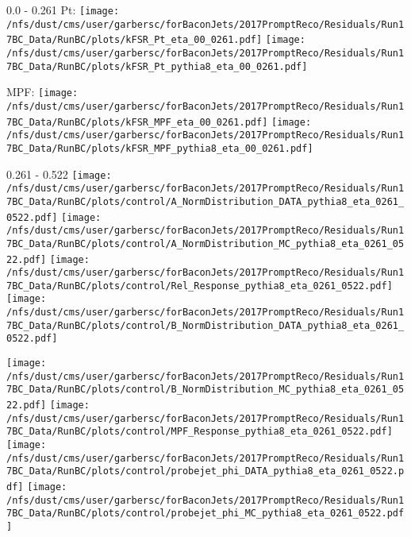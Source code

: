 \documentclass[t,compress]{beamer}
\begin{document}
\begin{frame}{0.0 - 0.261}
	 Pt: \texttt{[image: /nfs/dust/cms/user/garbersc/forBaconJets/2017PromptReco/Residuals/Run17BC\_Data/RunBC/plots/kFSR\_Pt\_eta\_00\_0261.pdf]}
	\texttt{[image: /nfs/dust/cms/user/garbersc/forBaconJets/2017PromptReco/Residuals/Run17BC\_Data/RunBC/plots/kFSR\_Pt\_pythia8\_eta\_00\_0261.pdf]}
\newline

	 MPF: \texttt{[image: /nfs/dust/cms/user/garbersc/forBaconJets/2017PromptReco/Residuals/Run17BC\_Data/RunBC/plots/kFSR\_MPF\_eta\_00\_0261.pdf]}
	\texttt{[image: /nfs/dust/cms/user/garbersc/forBaconJets/2017PromptReco/Residuals/Run17BC\_Data/RunBC/plots/kFSR\_MPF\_pythia8\_eta\_00\_0261.pdf]}
\end{frame}

\begin{frame}{0.261 - 0.522}
	\texttt{[image: /nfs/dust/cms/user/garbersc/forBaconJets/2017PromptReco/Residuals/Run17BC\_Data/RunBC/plots/control/A\_NormDistribution\_DATA\_pythia8\_eta\_0261\_0522.pdf]}
	\texttt{[image: /nfs/dust/cms/user/garbersc/forBaconJets/2017PromptReco/Residuals/Run17BC\_Data/RunBC/plots/control/A\_NormDistribution\_MC\_pythia8\_eta\_0261\_0522.pdf]}
	\texttt{[image: /nfs/dust/cms/user/garbersc/forBaconJets/2017PromptReco/Residuals/Run17BC\_Data/RunBC/plots/control/Rel\_Response\_pythia8\_eta\_0261\_0522.pdf]}
	\texttt{[image: /nfs/dust/cms/user/garbersc/forBaconJets/2017PromptReco/Residuals/Run17BC\_Data/RunBC/plots/control/B\_NormDistribution\_DATA\_pythia8\_eta\_0261\_0522.pdf]}
\newline

	\texttt{[image: /nfs/dust/cms/user/garbersc/forBaconJets/2017PromptReco/Residuals/Run17BC\_Data/RunBC/plots/control/B\_NormDistribution\_MC\_pythia8\_eta\_0261\_0522.pdf]}
	\texttt{[image: /nfs/dust/cms/user/garbersc/forBaconJets/2017PromptReco/Residuals/Run17BC\_Data/RunBC/plots/control/MPF\_Response\_pythia8\_eta\_0261\_0522.pdf]}
	\texttt{[image: /nfs/dust/cms/user/garbersc/forBaconJets/2017PromptReco/Residuals/Run17BC\_Data/RunBC/plots/control/probejet\_phi\_DATA\_pythia8\_eta\_0261\_0522.pdf]}
	\texttt{[image: /nfs/dust/cms/user/garbersc/forBaconJets/2017PromptReco/Residuals/Run17BC\_Data/RunBC/plots/control/probejet\_phi\_MC\_pythia8\_eta\_0261\_0522.pdf]}
\end{frame}
\end{document}
